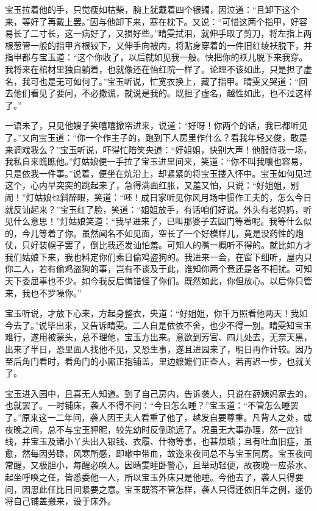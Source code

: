 \documentclass[12pt,oneside]{book}
\begin{document}
宝玉拉着他的手，只觉瘦如枯柴，腕上犹戴着四个银镯，因泣道：“且卸下这个来，等好了再戴上罢。”因与他卸下来，塞在枕下。又说：“可惜这两个指甲，好容易长了二寸长，这一病好了，又损好些。”晴雯拭泪，就伸手取了剪刀，将左指上两根葱管一般的指甲齐根铰下，又伸手向被内，将贴身穿着的一件旧红绫袄脱下，并指甲都与宝玉道：“这个你收了，以后就如见我一般。快把你的袄儿脱下来我穿。我将来在棺材里独自躺着，也就像还在怡红院一样了。论理不该如此，只是担了虚名，我可也是无可如何了。”宝玉听说，忙宽衣换上，藏了指甲。晴雯又哭道：“回去他们看见了要问，不必撒谎，就说是我的。既担了虚名，越性如此，也不过这样了。”

一语未了，只见他嫂子笑嘻嘻掀帘进来，说道：“好呀！你两个的话，我已都听见了。”又向宝玉道：“你一个作主子的，跑到下人房里作什么？看我年轻又俊，敢是来调戏我么？”宝玉听说，吓得忙陪笑央道：“好姐姐，快别大声！他服侍我一场，我私自来瞧瞧他。”灯姑娘便一手拉了宝玉进里间来，笑道：“你不叫我嚷也容易，只是依我一件事。”说着，便坐在炕沿上，却紧紧的将宝玉搂入怀中。宝玉如何见过这个，心内早突突的跳起来了，急得满面红胀，又羞又怕，只说：“好姐姐，别闹！”灯姑娘乜斜醉眼，笑道：“呸！成日家听见你风月场中惯作工夫的，怎么今日就反讪起来？”宝玉红了脸，笑道：“姐姐放手，有话咱们好说。外头有老妈妈，听见什么意思！”灯姑娘笑道：“我早进来了，已叫那婆子去园门等着呢。我等什么似的，今儿等着了你。虽然闻名不如见面，空长了一个好模样儿，竟是没药性的炮仗，只好装幌子罢了，倒比我还发讪怕羞。可知人的嘴一概听不得的。就比如方才我们姑娘下来，我也料定你们素日偷鸡盗狗的。我进来一会，在窗下细听，屋内只你二人，若有偷鸡盗狗的事，岂有不谈及于此，谁知你两个竟还是各不相扰。可知天下委屈事也不少。如今我反后悔错怪了你们。既然如此，你但放心。以后你只管来，我也不罗噪你。”

宝玉听说，才放下心来，方起身整衣，央道：“好姐姐，你千万照看他两天！我如今去了。”说毕出来，又告诉晴雯。二人自是依依不舍，也少不得一别。晴雯知宝玉难行，遂用被蒙头，总不理他，宝玉方出来。意欲到芳官、四儿处去，无奈天黑，出来了半日，恐里面人找他不见，又恐生事，遂且进园来了，明日再作计较。因乃至后角门看时，看角门的小厮正抱铺盖，里边嬷嬷们正查人，若再迟一步，也就关了。

宝玉进入园中，且喜无人知道。到了自己房内，告诉袭人，只说在薛姨妈家去的，也就罢了。一时铺床，袭人不得不问：“今日怎么睡？”宝玉道：“不管怎么睡罢了。”原来这一二年间，袭人因王夫人看重了他了，越发自要尊重。凡背人之处，或夜晚之间，总不与宝玉狎昵，较先幼时反倒疏远了。况虽无大事办理，然一应针线，并宝玉及诸小丫头出入银钱、衣履、什物等事，也甚烦琐；且有吐血旧症，虽愈，然每因劳碌，风寒所感，即嗽中带血，故迩来夜间总不与宝玉同房。宝玉夜间常醒，又极胆小，每醒必唤人。因晴雯睡卧警心，且举动轻便，故夜晚一应茶水、起坐呼唤之任，皆悉委他一人，所以宝玉外床只是他睡。今他去了，袭人只得要问，因思此任比日间紧要之意。宝玉既答不管怎样，袭人只得还依旧年之例，遂仍将自己铺盖搬来，设于床外。
\end{document}
